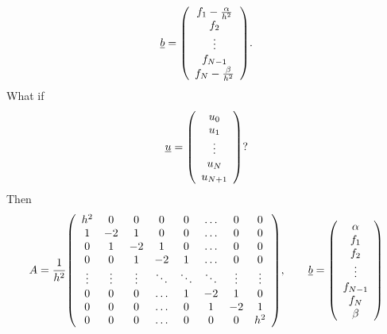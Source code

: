 \documentclass{article}
\begin{document}
        \begin{align*}
            \underline{b} = \qty(\begin{array}{c}
                f_1 - \frac{\alpha}{h^2} \\ f_2 \\ \vdots \\ f_{N-1} \\ f_N - \frac{\beta}{h^2}
            \end{array}).
        \end{align*}
        What if
        \begin{align*}
            \underline{u} = \qty(\begin{array}{c}
                u_0 \\ u_1 \\ \vdots \\ u_N \\ u_{N+1}
            \end{array})?
        \end{align*}
        Then
        \begin{align*}
            A = \frac{1}{h^2}\qty(\begin{array}{ccccccccc}
                h^2 & 0 & 0 & 0 & 0 & \dots & 0 & 0 \\
                1 & -2 & 1 & 0 & 0 & \dots & 0 & 0 \\
                0 & 1 & -2 & 1 & 0 & \dots & 0 & 0 \\
                0 & 0 & 1 & -2 & 1 & \dots & 0 & 0 \\
                \vdots & \vdots & \vdots & \ddots & \ddots & \ddots & \vdots & \vdots \\
                0 & 0 & 0 & \dots & 1 & -2 & 1 & 0 \\
                0 & 0 & 0 & \dots & 0 & 1 & -2 & 1 \\
                0 & 0 & 0 & \dots & 0 & 0 & 0 & h^2
            \end{array}), \qquad \underline{b} = \qty(\begin{array}{c}
                \alpha \\ f_1 \\ f_2 \\ \vdots \\ f_{N-1} \\ f_N \\ \beta
            \end{array})
        \end{align*}
\end{document}
